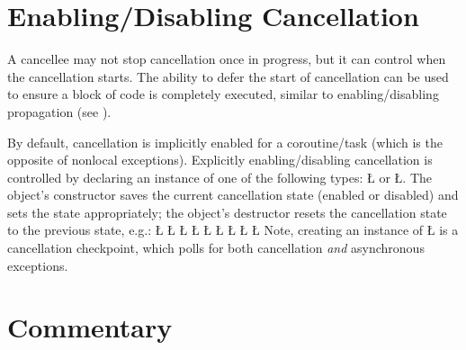 \documentclass[openright,twoside]{report}
\begin{document}
\section{Enabling/Disabling Cancellation}
\label{s:EnablingDisablingCancellation}

A cancellee may not stop cancellation once in progress, but it can control when the cancellation starts.
The ability to defer the start of cancellation can be used to ensure a block of code is completely executed, similar to enabling/disabling propagation (see ).

By default, cancellation is implicitly enabled for a coroutine/task (which is the opposite of nonlocal exceptions).
Explicitly enabling/disabling cancellation is controlled by declaring an instance of one of the following types: \LGinlinetrue\LGbegin\lgrinde\L{}\endlgrinde\LGend{} or \LGinlinetrue\LGbegin\lgrinde\L{}\endlgrinde\LGend{}.
The object's constructor saves the current cancellation state (enabled or disabled) and sets the state appropriately;
the object's destructor resets the cancellation state to the previous state, e.g.:
\LGinlinefalse\LGbegin\lgrinde
\L{\LB{\{}}
\L{\LB{}}
\CE{}\L{\LB{}}
\L{\LB{}}
\L{\LB{}}
\CE{}\L{\LB{}}
\CE{}\L{\LB{}}
\CE{}\L{\LB{}}
\L{\LB{\}}}
\CE{}\endlgrinde\LGend
Note, creating an instance of \LGinlinetrue\LGbegin\lgrinde\L{}\endlgrinde\LGend{} is a cancellation checkpoint, which polls for both cancellation \emph{and} asynchronous exceptions.


\section{Commentary}
\end{document}

